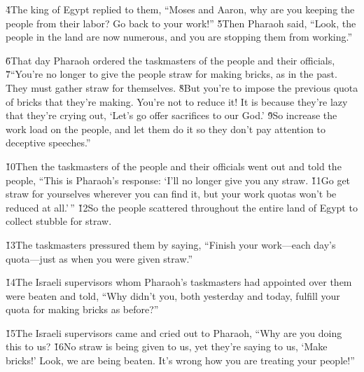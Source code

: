\v{4}The king of Egypt replied to them, ``Moses and Aaron, why are you keeping the people from their labor? Go back to your work!'' \v{5}Then Pharaoh said, ``Look, the people in the land are now numerous, and you are stopping them from working.''

\v{6}That day Pharaoh ordered the taskmasters of the people and their officials, \v{7}``You're no longer to give the people straw for making bricks, as in the past. They must gather straw for themselves. \v{8}But you're to impose the previous quota of bricks that they're making. You're not to reduce it! It is because they're lazy that they're crying out, `Let's go offer sacrifices to our God.' \v{9}So increase the work load on the people, and let them do it so they don't pay attention to deceptive speeches.''

\v{10}Then the taskmasters of the people and their officials went out and told the people, ``This is Pharaoh's response: `I'll no longer give you any straw. \v{11}Go get straw for yourselves wherever you can find it, but your work quotas won't be reduced at all.'\,'' \v{12}So the people scattered throughout the entire land of Egypt to collect stubble for straw.

\v{13}The taskmasters pressured them by saying, ``Finish your work---each day's quota---just as when you were given straw.''

\v{14}The Israeli supervisors whom Pharaoh's taskmasters had appointed over them were beaten and told, ``Why didn't you, both yesterday and today, fulfill your quota for making bricks as before?''

\v{15}The Israeli supervisors came and cried out to Pharaoh, ``Why are you doing this to us? \v{16}No straw is being given to us, yet they're saying to us, `Make bricks!' Look, we are being beaten. It's wrong how you are treating your people!''

